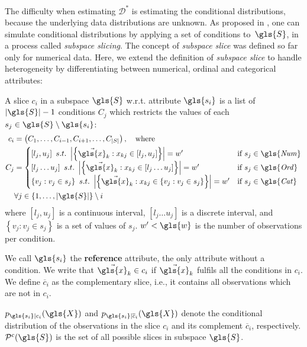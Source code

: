 The difficulty when estimating $\mathcal{D}^*$ is estimating the conditional distributions, because the underlying data distributions are unknown. 
As proposed in \cite{DBLP:conf/icde/KellerMB12}, one can simulate conditional distributions by applying a set of conditions \mbox{to $\gls{S}$}, in a process called \textit{subspace slicing}. The concept of \textit{subspace slice} was defined so far only for numerical data. Here, we extend the definition of \textit{subspace slice} to handle heterogeneity by differentiating between numerical, ordinal and categorical attributes:  
\begin{definition}
	\label{slice}
	A slice $c_{i}$ in a subspace $\gls{S}$ w.r.t. attribute $\gls{s_i}$ is a list of $\left |\gls{S} \right |-1$ conditions $C_j$ 
	 which restricts the values of each $s_j \in \gls{S} \setminus {\gls{s_i}}$: 
	\begin{equation*}
	\begin{split}
	c_i &= \left ( C_1, \dots, C_{i-1}, C_{i+1}, \dots, C_{|S|} \right ), \quad \text{where} \\
	C_j &= \begin{cases}
  \left[l_{j}, u_{j} \right]~s.t.~\left | \left \{\vec{\gls{x}}_k : x_{kj}  \in \left [l_{j}, u_{j} \right ] \right \} \right | = w' &\text{if}~ s_j \in \mathit{\gls{Num}}
\\ \left[l_{j} \dots u_{j} \right]~s.t.~\left | \left \{\vec{\gls{x}}_k : x_{kj}  \in \left [l_{j} \dots u_{j} \right ]\right \} \right | = w' &\text{if}~ s_j \in \mathit{\gls{Ord}}
\\ \left\{v_j: v_j \in s_j \right\}~s.t.~\left | \left \{\vec{\gls{x}}_k : x_{kj} \in \left\{v_j: v_j \in s_j \right\}  \right \} \right | = w' &\text{if}~ s_j \in \mathit{\gls{Cat}}
\end{cases} \\
&\forall j\in \{1, \dots, |\gls{S}|\} \setminus{i}
	\end{split} 
    \end{equation*} 
	where $\left[l_{j}, u_{j} \right]$ is a continuous interval,  $\left[l_{j} \dots u_{j} \right]$ is a discrete interval, and $\left\{v_j: v_j \in s_j \right\} $ is a set of values of $s_j$. $w' < \gls{w}$ is the number of observations per condition.  
	
	We call $\gls{s_i}$ the \textbf{reference} attribute, the only attribute without a condition.  
	We write that $\vec{\gls{x}}_k \in c_i$ if 
	$\vec{\gls{x}}_k$ fulfils all the conditions in $c_i$. We define $\overline{c}_i$ as the complementary slice, i.e., it contains all observations 
	which are not in $c_i$. 
	
	$p_{\gls{s_i} | c_i}(\gls{X})$ and $p_{\gls{s_i} | \overline{c}_i}(\gls{X})$ denote the conditional distribution of the observations in the slice $c_i$ and its complement $\overline{c}_i$, respectively.
$\mathcal{P}^{c}(\gls{S})$ is the set of all possible slices in subspace $\gls{S}$.
\end{definition}

